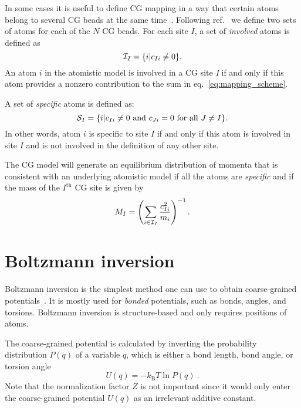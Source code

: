 In some cases it is useful to define CG mapping in a way that certain atoms belong to several CG beads at the same time~\cite{Fritz:2009}. Following ref.~\cite{Noid:2008.1} we define two sets of atoms for each of the $N$ CG beads. For each site $I$, a set of {\em involved} atoms is defined as
\begin{equation}
 {\cal I}_I=\{i|c_{Ii}\ne0\}.
\end{equation}
An atom $i$ in the atomistic model is involved in a CG site {\it I} if and only if this atom provides a nonzero contribution to the sum in eq.~\ref{eq:mapping_scheme}.

A set of {\em specific} atoms is defined as:
\begin{equation}
 {\cal S}_I=\{i|c_{Ii}\ne0 \text{ and } c_{Ji}=0 \text{ for all } J \ne I\}.
\end{equation}
In other words, atom $i$ is specific to site $I$ if and only if this atom is involved in site $I$ and is not involved in the definition of any other site.

The CG model will generate an equilibrium distribution of momenta that is consistent with an underlying atomistic model if all the atoms are {\em specific} and if the mass of the $I^\text{th}$ CG site is given by~\cite{Noid:2008.1}
\begin{equation}
M_I= \left( \sum_{i \in {\cal I}_I}\frac{c_{Ii}^2}{m_i} \right)^{-1}.
\end{equation}

\section{Boltzmann inversion}
\label{sec:bi}

Boltzmann inversion is the simplest method one can use to obtain coarse-grained potentials~\cite{Tschoep:1998}. It is mostly used for {\em bonded} potentials, such as bonds, angles, and torsions. Boltzmann inversion is structure-based and only requires positions of atoms.

The coarse-grained potential is calculated by inverting the probability distribution $P(q)$ of a variable $q$, which is either a bond length, bond angle, or torsion angle
\begin{equation}
  U(q) = - k_\text{B} T \ln  P(q) ~.
  \label{eq:inv_boltzmann}
\end{equation}
%
Note that the normalization factor $Z$ is not important since it would only enter the coarse-grained potential $U(q)$ as an irrelevant additive constant.


